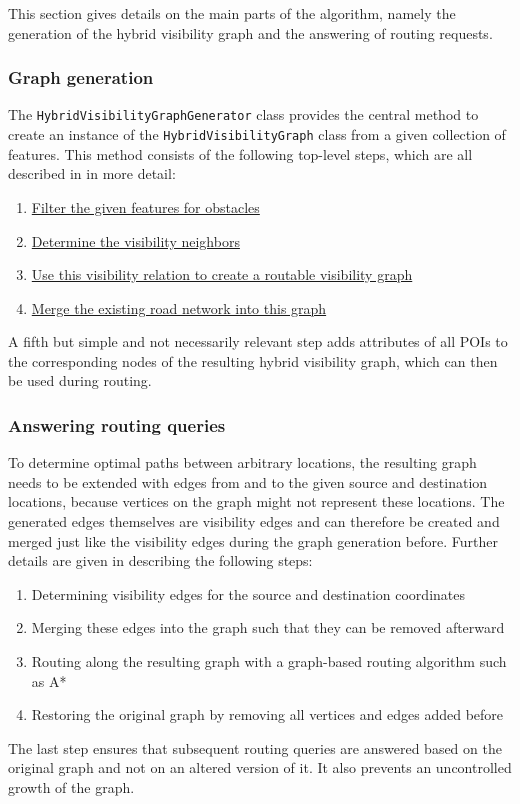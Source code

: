		This section gives details on the main parts of the algorithm, namely the generation of the hybrid visibility graph and the answering of routing requests.
		
		\subsubsection{Graph generation}
		\label{subsubsec:graph-generation}
		
			The \texttt{HybridVisibilityGraphGenerator} class provides the central method to create an instance of the \texttt{HybridVisibilityGraph} class from a given collection of features.
			This method consists of the following top-level steps, which are all described in  in more detail:
			\begin{enumerate}
				\item \hyperref[subsec:step-1-preprocessing]{Filter the given features for obstacles}
				\item \hyperref[subsec:step-2-knn-search]{Determine the visibility neighbors}
				\item \hyperref[subsec:step-3-graph-creation]{Use this visibility relation to create a routable visibility graph}
				\item \hyperref[subsec:step-4-graph merging]{Merge the existing road network into this graph}
			\end{enumerate}
			A fifth but simple and not necessarily relevant step adds attributes of all POIs to the corresponding nodes of the resulting hybrid visibility graph, which can then be used during routing.
		
		\subsubsection{Answering routing queries}
		
			To determine optimal paths between arbitrary locations, the resulting graph needs to be extended with edges from and to the given source and destination locations, because vertices on the graph might not represent these locations.
			The generated edges themselves are visibility edges and can therefore be created and merged just like the visibility edges during the graph generation before.
			Further details are given in  describing the following steps:
			\begin{enumerate}
				\item Determining visibility edges for the source and destination coordinates
				\item Merging these edges into the graph such that they can be removed afterward
				\item Routing along the resulting graph with a graph-based routing algorithm such as A*
				\item Restoring the original graph by removing all vertices and edges added before
			\end{enumerate}
			The last step ensures that subsequent routing queries are answered based on the original graph and not on an altered version of it.
			It also prevents an uncontrolled growth of the graph.
	
